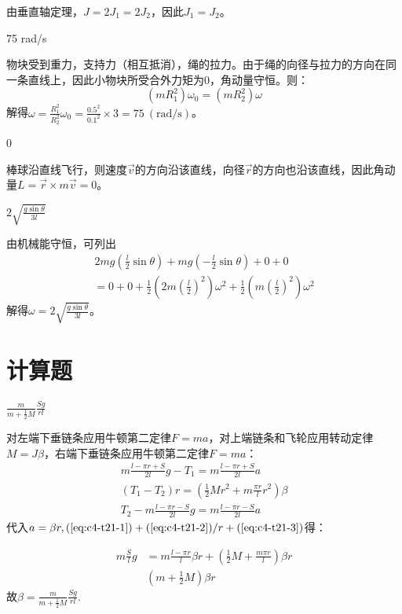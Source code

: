 \documentclass[b5paper,opensource,sourcefont,parskip]{qyxf-book}
\begin{document}
由垂直轴定理，$ J=2J_1=2J_2 $，因此$ J_1=J_2 $。

75 rad/s

\solve 物块受到重力，支持力（相互抵消），绳的拉力。由于绳的向径与拉力的方向在同一条直线上，因此小物块所受合外力矩为0，角动量守恒。则：
\[(mR_1^2)\omega_0=(mR_2^2)\omega\]
解得$\omega=\frac{R_1^2}{R_2^2}\omega_0=\frac{0.5^2}{0.1^2}\times 3=75\ (\mathrm{rad/s})$。

0

\solve 棒球沿直线飞行，则速度$ \vec{v} $的方向沿该直线，向径$ \vec{r} $的方向也沿该直线，因此角动量$ L=\vec{r}\times m\vec{v}=0 $。

$2\sqrt{\frac{g\sin\theta}{3l}}$

\solve 由机械能守恒，可列出
\begin{gather*}
\hspace{1pt}2mg\left(\frac{l}{2}\sin\theta\right)+mg\left(-\frac{l}{2}\sin\theta\right)+0+0\\
=0+0+\frac{1}{2}\left(2m\left(\frac{l}{2}\right)^2\right)\omega^2+\frac{1}{2}\left(m\left(\frac{l}{2}\right)^2\right)\omega^2
\end{gather*}
解得$\omega=2\sqrt{\frac{g\sin\theta}{3l}}$。

\section{计算题}

$\frac{m}{m+\frac{1}{2}M}\frac{Sg}{rl}$

\solve 对左端下垂链条应用牛顿第二定律$F=ma$，对上端链条和飞轮应用转动定律$M=J\beta$，右端下垂链条应用牛顿第二定律$F=ma$：
\begin{gather}
m\frac{l-\pi r+S}{2l}g-T_1=m\frac{l-\pi r+S}{2l}a\label{eq:c4-t21-1}\\
(T_1-T_2)r=\left(\frac{1}{2}Mr^2+m\frac{\pi r}{l}r^2\right)\beta\label{eq:c4-t21-2}\\
T_2-m\frac{l-\pi r-S}{2l}g=m\frac{l-\pi r-S}{2l}a\label{eq:c4-t21-3}
\end{gather}
代入$a=\beta r,(\ref{eq:c4-t21-1})+(\ref{eq:c4-t21-2})/r+(\ref{eq:c4-t21-3})$得：

\begin{align*}
m\frac{S}{l}g&=m\frac{l-\pi r}{l}\beta r+\left(\frac{1}{2}M+\frac{m\pi r}{l}\right)\beta r\\
&\left(m+\frac{1}{2}M\right)\beta r
\end{align*}
故$\beta=\frac{m}{m+\frac{1}{2}M}\frac{Sg}{rl}$.
\end{document}
